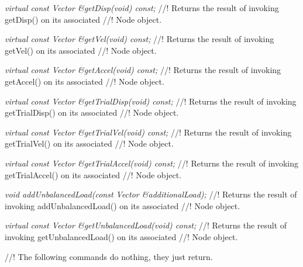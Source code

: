 {\em  virtual const Vector \&getDisp(void) const;}
//! Returns the result of invoking getDisp() on its associated
//! Node object. 


{\em  virtual const Vector \&getVel(void) const;}
//! Returns the result of invoking getVel() on its associated
//! Node object. 


{\em  virtual const Vector \&getAccel(void) const;}
//! Returns the result of invoking getAccel() on its associated
//! Node object. 


{\em  virtual const Vector \&getTrialDisp(void) const;}
//! Returns the result of invoking getTrialDisp() on its associated
//! Node object. 


{\em  virtual const Vector \&getTrialVel(void) const;}
//! Returns the result of invoking getTrialVel() on its associated
//! Node object. 


{\em  virtual const Vector \&getTrialAccel(void) const;}
//! Returns the result of invoking getTrialAccel() on its associated
//! Node object. 


{\em void addUnbalancedLoad(const Vector \&additionalLoad);}
//! Returns the result of invoking addUnbalancedLoad() on its associated
//! Node object. 

{\em virtual const Vector \&getUnbalancedLoad(void) const;}
//! Returns the result of invoking getUnbalancedLoad() on its associated
//! Node object. 



//! The following commands do nothing, they just return.
